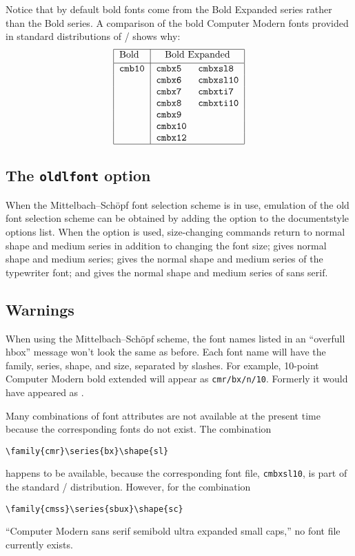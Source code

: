 Notice that by default bold fonts come from the Bold Expanded series
rather than the Bold series.  A comparison of the bold Computer Modern
fonts provided in standard distributions of \tex/ shows why:
\[\begin{tabular}{|l|ll|}
\hline
Bold& \multicolumn{2}{c|}{Bold Expanded}\\[2pt]
\hline
{\tt cmb10}&    {\tt cmbx5}&    {\tt cmbxsl8}\\
        &       {\tt cmbx6}&    {\tt cmbxsl10}\\
        &       {\tt cmbx7}&    {\tt cmbxti7}\\
        &       {\tt cmbx8}&    {\tt cmbxti10}\\
        &       {\tt cmbx9}&\\
        &       {\tt cmbx10}&\\
        &       {\tt cmbx12}&\\
\hline
\end{tabular}\]


\subsection{The {\tt oldlfont} option}
\label{s:oldlfont}

When the Mittelbach--Sch\"opf font selection
scheme is in use, emulation of the old font selection scheme can
be obtained by adding the option  to the documentstyle
options list.  When the  option is used, size-changing
commands return to normal shape and medium series in addition
to changing the font size;  gives normal shape and medium
series;  gives the normal shape and medium series
of the typewriter font; and  gives the normal shape and
medium series of sans serif.

\subsection{Warnings}

When using the Mittelbach--Sch\"opf scheme, the font names listed in
an ``overfull hbox'' message won't look the same as before.  Each font
name will have the family, series, shape, and size, separated by
slashes. For example, 10-point Computer Modern bold extended will
appear as {\tt \bslash cmr/bx/n/10}.  Formerly it would have appeared
as .

Many combinations of font attributes are not available at the
present time because the corresponding fonts do not exist.
The combination
\begin{verbatim}
\family{cmr}\series{bx}\shape{sl}
\end{verbatim}
happens to be available, because the corresponding font file,
{\tt cmbxsl10}, is part of the standard \tex/ distribution.
However, for the combination
\begin{verbatim}
\family{cmss}\series{sbux}\shape{sc}
\end{verbatim}
``Computer Modern sans serif semibold ultra expanded small caps,''
no font file currently exists.

